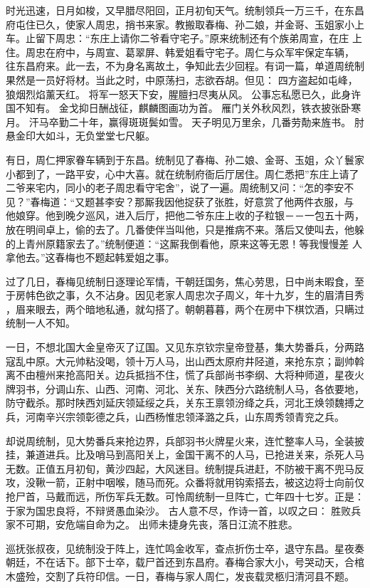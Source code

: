 时光迅速，日月如梭，又早腊尽阳回，正月初旬天气。统制领兵一万三千，在东昌
府屯住已久，使家人周忠，捎书来家。教搬取春梅、孙二娘，并金哥、玉姐家小上
车。止留下周忠：“东庄上请你二爷看守宅子。”原来统制还有个族弟周宣，在庄
上住。周忠在府中，与周宣、葛翠屏、韩爱姐看守宅子。周仁与众军牢保定车辆，
往东昌府来。此一去，不为身名离故土，争知此去少回程。有词一篇，单道周统制
果然是一员好将材。当此之时，中原荡扫，志欲吞胡。但见：
四方盗起如屯峰，狼烟烈焰薰天红。
将军一怒天下安，腥膻扫尽夷从风。
公事忘私愿已久，此身许国不知有。
金戈抑日酬战征，麒麟图画功为首。
雁门关外秋风烈，铁衣披张卧寒月。
汗马卒勤二十年，赢得斑斑鬓如雪。
天子明见万里余，几番劳勣来旌书。
肘悬金印大如斗，无负堂堂七尺躯。

有日，周仁押家眷车辆到于东昌。统制见了春梅、孙二娘、金哥、玉姐，众丫鬟家
小都到了，一路平安，心中大喜。就在统制府衙后厅居住。周仁悉把”东庄上请了
二爷来宅内，同小的老子周忠看守宅舍”，说了一遍。周统制又问：“怎的李安不
见？”春梅道：“又题甚李安？那厮我因他捉获了张胜，好意赏了他两件衣服，与
他娘穿。他到晚夕巡风，进入后厅，把他二爷东庄上收的子粒银－－一包五十两，
放在明间卓上，偷的去了。几番使伴当叫他，只是推病不来。落后又使叫去，他躲
的上青州原籍家去了。”统制便道：“这厮我倒看他，原来这等无恩！等我慢慢差
人拿他去。”这春梅也不题起韩爱姐之事。

过了几日，春梅见统制日逐理论军情，干朝廷国务，焦心劳思，日中尚未暇食，至
于房帏色欲之事，久不沾身。因见老家人周忠次子周义，年十九岁，生的眉清目秀
，眉来眼去，两个暗地私通，就勾搭了。朝朝暮暮，两个在房中下棋饮酒，只瞒过
统制一人不知。

一日，不想北国大金皇帝灭了辽国。又见东京钦宗皇帝登基，集大势番兵，分两路
寇乱中原。大元帅粘没喝，领十万人马，出山西太原府井陉道，来抢东京；副帅斡
离不由檀州来抢高阳关。边兵抵挡不住，慌了兵部尚书李纲、大将种师道，星夜火
牌羽书，分调山东、山西、河南、河北、关东、陕西分六路统制人马，各依要地，
防守截杀。那时陕西刘延庆领延绥之兵，关东王禀领汾绛之兵，河北王焕领魏搏之
兵，河南辛兴宗领彰德之兵，山西杨惟忠领泽潞之兵，山东周秀领青兖之兵。

却说周统制，见大势番兵来抢边界，兵部羽书火牌星火来，连忙整率人马，全装披
挂，兼道进兵。比及哨马到高阳关上，金国干离不的人马，已抢进关来，杀死人马
无数。正值五月初旬，黄沙四起，大风迷目。统制提兵进赶，不防被干离不兜马反
攻，没鞦一箭，正射中咽喉，随马而死。众番将就用钩索搭去，被这边将士向前仅
抢尸首，马戴而远，所伤军兵无数。可怜周统制一旦阵亡，亡年四十七岁。正是：
于家为国忠良将，不辩贤愚血染沙。
古人意不尽，作诗一首，以叹之曰：
胜败兵家不可期，安危端自命为之。
出师未捷身先丧，落日江流不胜悲。

巡抚张叔夜，见统制没于阵上，连忙鸣金收军，查点折伤士卒，退守东昌。星夜奏
朝廷，不在话下。部下士卒，载尸首还到东昌府。春梅合家大小，号哭动天，合棺
木盛殓，交割了兵符印信。一日，春梅与家人周仁，发丧载灵柩归清河县不题。


